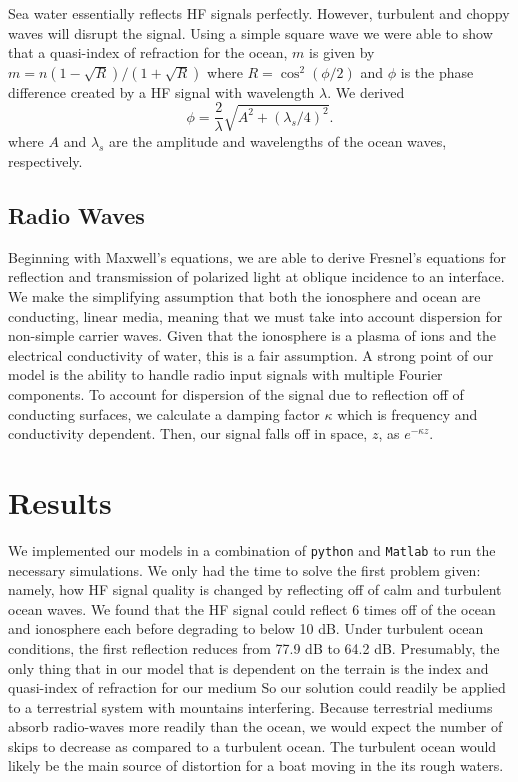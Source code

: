 \documentclass[11pt, twocolumn]{article}
\numberwithin{equation}{section}
\begin{document}
Sea water essentially reflects HF signals perfectly.\cite{seawater_index} However, turbulent and choppy waves will disrupt the signal. Using a simple square wave we were able to show that a quasi-index of refraction for the ocean, $m$ is given by $m = n (1 - \sqrt R)/(1+\sqrt{R})$ where $R = \cos^2(\phi/2)$ and $\phi$ is the phase difference created by a HF signal with wavelength $\lambda$. We derived
\begin{equation}
    \phi  = \frac{2}{\lambda}\sqrt{A^2 + (\lambda_s/4)^2}.
\end{equation}
where $A$ and $\lambda_s$ are the amplitude and wavelengths of the ocean waves, respectively.

\subsection{Radio Waves} %
\label{sub:the_radio} 

Beginning with Maxwell's equations, we are able to derive Fresnel's equations for reflection and transmission of polarized light at oblique incidence to an interface. We make the simplifying assumption that both the ionosphere and ocean are conducting, linear media, meaning that we must take into account dispersion for non-simple carrier waves. Given that the ionosphere is a plasma of ions and the electrical conductivity of water, this is a fair assumption. A strong point of our model is the ability to handle radio input signals with multiple Fourier components. To account for dispersion of the signal due to reflection off of conducting surfaces, we calculate a damping factor $\kappa$ which is frequency and conductivity dependent. Then, our signal falls off in space, $z$, as $e^{-\kappa z}$.


\section{Results} %
\label{sec:results}
 
 We implemented our models in a combination of \texttt{python} and \texttt{Matlab} to run the necessary simulations. We only had the time to solve the first problem given: namely, how HF signal quality is changed by reflecting off of calm and turbulent ocean waves. We found that the HF signal could reflect 6 times off of the ocean and ionosphere each before degrading to below 10 dB. Under turbulent ocean conditions, the first reflection reduces from 77.9 dB to 64.2 dB. Presumably, the only thing that in our model that is dependent on the terrain is the index and quasi-index of refraction for our medium So our solution could readily be applied to a terrestrial system with mountains interfering. Because terrestrial mediums absorb radio-waves more readily than the ocean, we would expect the number of skips to decrease as compared to a turbulent ocean. The turbulent ocean would likely be the main source of distortion for a boat moving in the its rough waters.
\end{document}
